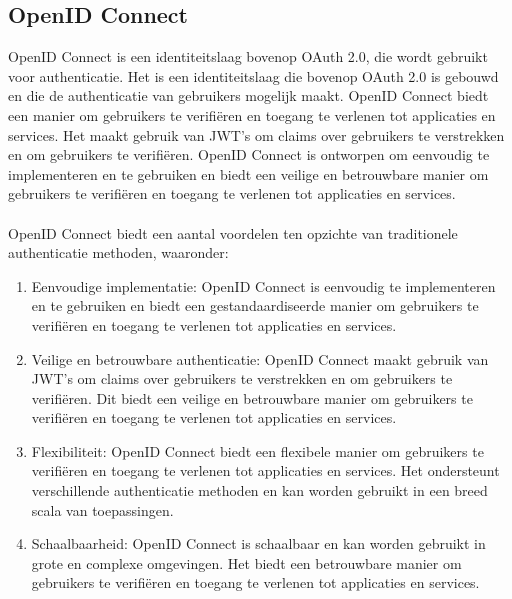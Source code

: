   \subsection{OpenID Connect}%
  \label{subsec:openid-connect}
  OpenID Connect is een identiteitslaag bovenop OAuth 2.0, die wordt gebruikt voor authenticatie. Het is een identiteitslaag die bovenop 
  OAuth 2.0 is gebouwd en die de authenticatie van gebruikers mogelijk maakt. OpenID Connect biedt een manier om gebruikers te verifiëren 
  en toegang te verlenen tot applicaties en services. Het maakt gebruik van JWT's om claims over gebruikers te verstrekken en om 
  gebruikers te verifiëren. OpenID Connect is ontworpen om eenvoudig te implementeren en te gebruiken en biedt een veilige en betrouwbare manier om 
  gebruikers te verifiëren en toegang te verlenen tot applicaties en services.
  \\
  \\
  OpenID Connect biedt een aantal voordelen ten opzichte van traditionele authenticatie methoden, waaronder:
  \begin{enumerate}[label=\textbf{-}]
      \item Eenvoudige implementatie: OpenID Connect is eenvoudig te implementeren en te gebruiken en biedt een gestandaardiseerde manier om gebruikers te verifiëren en toegang te verlenen tot applicaties en services.
      \item Veilige en betrouwbare authenticatie: OpenID Connect maakt gebruik van JWT's om claims over gebruikers te verstrekken en om gebruikers te verifiëren. Dit biedt een veilige en betrouwbare manier om gebruikers te verifiëren en toegang te verlenen tot applicaties en services.
      \item Flexibiliteit: OpenID Connect biedt een flexibele manier om gebruikers te verifiëren en toegang te verlenen tot applicaties en services. Het ondersteunt verschillende authenticatie methoden en kan worden gebruikt in een breed scala van toepassingen.
      \item Schaalbaarheid: OpenID Connect is schaalbaar en kan worden gebruikt in grote en complexe omgevingen. Het biedt een betrouwbare manier om gebruikers te verifiëren en toegang te verlenen tot applicaties en services.
  \end{enumerate}
  \autocite{Sakimura2014}


